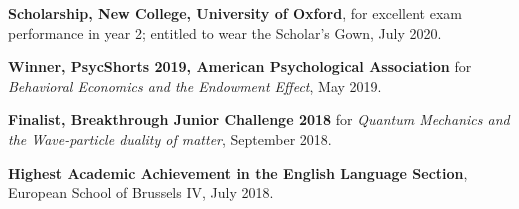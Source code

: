 \documentclass[11pt, a4paper]{article}
\begin{document}
\begin{flushleft}
    \hspace{1cm}\hangindent=1cm \textbf{Scholarship, New College, University of Oxford}, for excellent exam performance in year 2; entitled to wear the Scholar's Gown, July 2020. \\
\end{flushleft}
\begin{flushleft}
    \hspace{1cm}\hangindent=1cm \textbf{Winner, PsycShorts 2019, American Psychological Association} for \textit{Behavioral Economics and the Endowment Effect}, May 2019. \\
\end{flushleft}
\begin{flushleft}
    \hspace{1cm}\hangindent=1cm \textbf{Finalist, Breakthrough Junior Challenge 2018} for \textit{Quantum Mechanics and the Wave-particle duality of matter}, September 2018. \\
\end{flushleft}
\begin{flushleft} 
    \hspace{1cm}\hangindent=1cm \textbf{Highest Academic Achievement in the English Language Section}, European School of Brussels IV, July 2018. \\
\end{flushleft}
\end{document}
